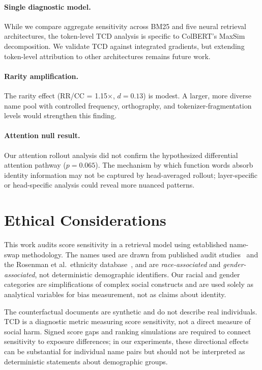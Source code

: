 \documentclass[11pt]{article}
\begin{document}
\paragraph{Single diagnostic model.} While we compare aggregate sensitivity across BM25 and five neural retrieval architectures, the token-level TCD analysis is specific to ColBERT's MaxSim decomposition. We validate TCD against integrated gradients, but extending token-level attribution to other architectures remains future work.

\paragraph{Rarity amplification.} The rarity effect (RR/CC = 1.15$\times$, $d = 0.13$) is modest. A larger, more diverse name pool with controlled frequency, orthography, and tokenizer-fragmentation levels would strengthen this finding.

\paragraph{Attention null result.} Our attention rollout analysis did not confirm the hypothesized differential attention pathway ($p = 0.065$). The mechanism by which function words absorb identity information may not be captured by head-averaged rollout; layer-specific or head-specific analysis could reveal more nuanced patterns.


\section*{Ethical Considerations}

This work audits score sensitivity in a retrieval model using established name-swap methodology. The names used are drawn from published audit studies~\citep{bertrand2004} and the Rosenman et al.\ ethnicity database~\citep{rosenman2023}, and are \emph{race-associated} and \emph{gender-associated}, not deterministic demographic identifiers. Our racial and gender categories are simplifications of complex social constructs and are used solely as analytical variables for bias measurement, not as claims about identity.

The counterfactual documents are synthetic and do not describe real individuals. TCD is a diagnostic metric measuring score sensitivity, not a direct measure of social harm. Signed score gaps and ranking simulations are required to connect sensitivity to exposure differences; in our experiments, these directional effects can be substantial for individual name pairs but should not be interpreted as deterministic statements about demographic groups.
\end{document}

